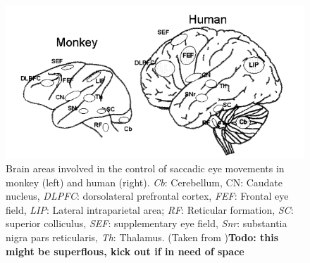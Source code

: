 \documentclass[a4paper, 12pt]{scrreprt}
\begin{document}
\begin{figure}[H]
	\includegraphics[scale=0.5]{img/saccregions.png}
	\caption[Regions involved in saccadic eye movements.]{\small{Brain areas involved in the control of saccadic eye movements in monkey (left) and human (right). \textit{Cb}: Cerebellum, CN: Caudate nucleus, \textit{DLPFC}: dorsolateral prefrontal cortex, \textit{FEF}: Frontal eye field, \textit{LIP}: Lateral intraparietal area; \textit{RF}: Reticular formation, \textit{SC}: superior colliculus, \textit{SEF}: supplementary eye field, \textit{Snr}: substantia nigra pars reticularis, \textit{Th}: Thalamus. (Taken from \textcite{munoz2002commentary})}\textbf{Todo: this might be superflous, kick out if in need of space}}
	\label{fig:saccregions}
\end{figure}
\end{document}

